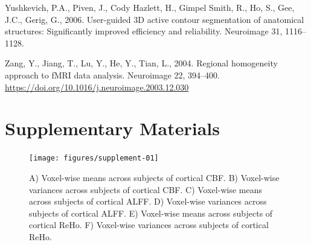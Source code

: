 \documentclass[
  12pt,
]{article}
\newlength{\cslhangindent}
\newlength{\cslentryspacingunit} %
\newenvironment{CSLReferences}[2] %
 {%
  \setlength{\parindent}{0pt}
  \ifodd #1
  \let\oldpar\par
  \def\par{\hangindent=\cslhangindent\oldpar}
  \fi
  \setlength{\parskip}{#2\cslentryspacingunit}
 }%
 {}
\begin{document}
\begin{CSLReferences}{1}{0}
\leavevmode{}%
Yushkevich, P.A., Piven, J., Cody Hazlett, H., Gimpel Smith, R., Ho, S., Gee, J.C., Gerig, G., 2006. User-guided {3D} active contour segmentation of anatomical structures: Significantly improved efficiency and reliability. Neuroimage 31, 1116--1128.

\leavevmode{}%
Zang, Y., Jiang, T., Lu, Y., He, Y., Tian, L., 2004. Regional homogeneity approach to {fMRI} data analysis. Neuroimage 22, 394--400. \url{https://doi.org/10.1016/j.neuroimage.2003.12.030}

\end{CSLReferences}

\newpage

\hypertarget{supplementary-materials}{%
\section{Supplementary Materials}\label{supplementary-materials}}

\begin{figure}
\texttt{[image: figures/supplement-01]} \caption{A) Voxel-wise means across subjects of cortical CBF. B) Voxel-wise variances across subjects of cortical CBF. C) Voxel-wise means across subjects of cortical ALFF. D) Voxel-wise variances across subjects of cortical ALFF. E) Voxel-wise means across subjects of cortical ReHo. F) Voxel-wise variances across subjects of cortical ReHo.}\label{fig:supplement}
\end{figure}
\end{document}
